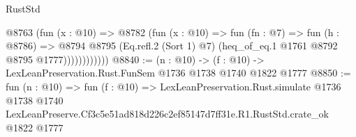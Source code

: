 \begin{lexlean}{RustStd}
\begin{coremodule}
                    @8763
                      (fun (x : @10) =>
                      @8782
                        (fun (x : @10) =>
                        fun (fn : @7) =>
                        fun (h : @8786) =>
                        @8794
                          @8795
                          (Eq.refl.{2} (Sort 1) @7)
                          (heq_of_eq.{1} @1761 @8792 @8795 @1777))))))))))))
@8840 := (n : @10) -> (f : @10) -> LexLeanPreservation.Rust.FunSem @1736 @1738 @1740 @1822 @1777
@8850 := fun (n : @10) =>
  fun (f : @10) =>
  LexLeanPreservation.Rust.simulate
    @1736
    @1738
    @1740
    LexLeanPreserve.Cf3c5e51ad818d226c2ef85147d7ff31e.R1.RustStd.crate_ok
    @1822
    @1777
\end{coremodule}
\end{lexlean}
